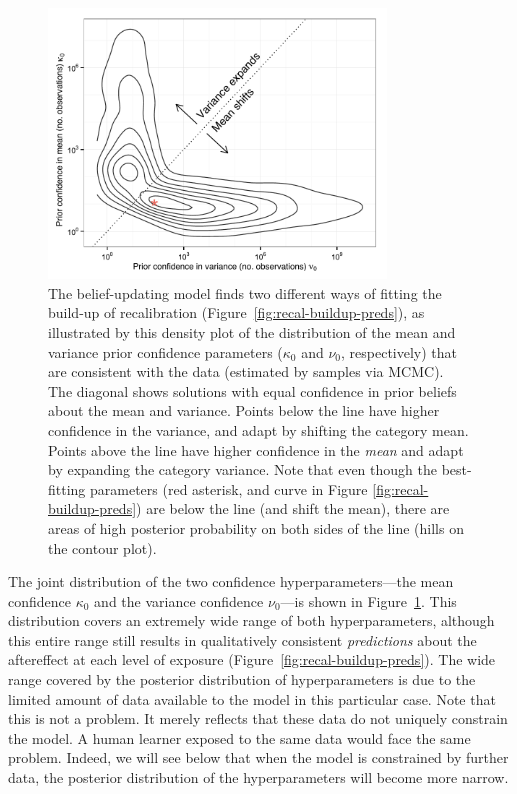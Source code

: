 \begin{figure}[htb]
  \centering
  \includegraphics[width=0.8\textwidth]{figure/vroomen-recal-64-kappa-nu-joint-posterior-contour.pdf}
  \caption{The belief-updating model finds two different ways of fitting the build-up of recalibration (Figure~\ref{fig:recal-buildup-preds}), as illustrated by this density plot of the distribution of the mean and variance prior confidence parameters ($\kappa_0$ and $\nu_0$, respectively) that are consistent with the data (estimated by samples via MCMC).  The diagonal shows solutions with equal confidence in prior beliefs about the mean and variance.  Points below the line have higher confidence in the variance, and adapt by shifting the category mean.  Points above the line have higher confidence in the \emph{mean} and adapt by expanding the category variance.  Note that even though the best-fitting parameters (red asterisk, and curve in Figure \ref{fig:recal-buildup-preds}) are below the line (and shift the mean), there are areas of high posterior probability on both sides of the line (hills on the contour plot).} 
  \label{fig:vroomen-recal-joint-posterior}
\end{figure}

The joint distribution of the two confidence hyperparameters---the mean confidence $\kappa_0$ and the variance confidence $\nu_0$---is shown in Figure~\ref{fig:vroomen-recal-joint-posterior}.  This distribution covers an extremely wide range of both hyperparameters, although this entire range still results in qualitatively consistent \emph{predictions} about the aftereffect at each level of exposure (Figure~\ref{fig:recal-buildup-preds}).  The wide range covered by the posterior distribution of hyperparameters is due to the limited amount of data available to the model in this particular case. Note that this is not a problem. It merely reflects that these data do not uniquely constrain the model. A human learner exposed to the same data would face the same problem. Indeed, we will see below that when the model is constrained by further data, the posterior distribution of the hyperparameters will become more narrow.

